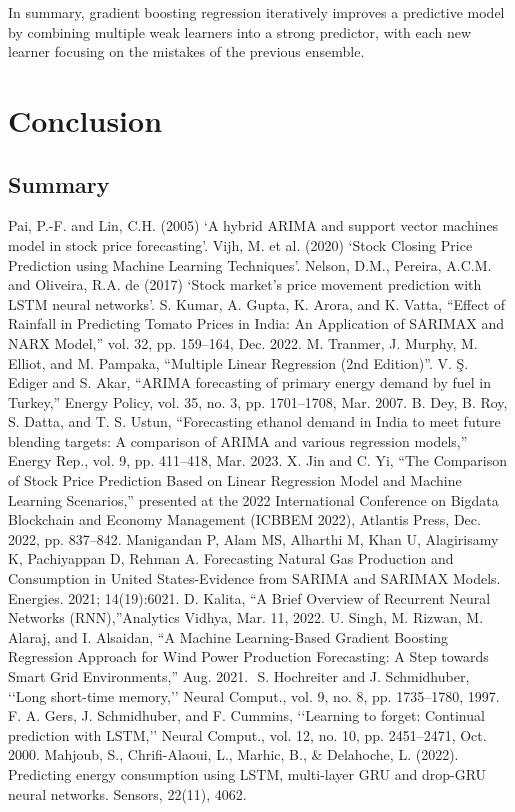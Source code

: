 \documentclass{ieeeojies}
\begin{document}
In summary, gradient boosting regression iteratively improves a predictive model by combining multiple weak learners into a strong predictor, with each new learner focusing on the mistakes of the previous ensemble.

\section{Conclusion}
\subsection{Summary}

\begin{thebibliography}{00}
 Pai, P.-F. and Lin, C.H. (2005) ‘A hybrid ARIMA and support vector machines model in stock price forecasting’.
 Vijh, M. et al. (2020) ‘Stock Closing Price Prediction using Machine Learning Techniques’.
Nelson, D.M., Pereira, A.C.M. and Oliveira, R.A. de (2017) ‘Stock market’s price movement prediction with LSTM neural networks’.
S. Kumar, A. Gupta, K. Arora, and K. Vatta, “Effect of Rainfall in Predicting Tomato Prices in India: An Application of SARIMAX and NARX Model,” vol. 32, pp. 159–164, Dec. 2022. 
M. Tranmer, J. Murphy, M. Elliot, and M. Pampaka, “Multiple Linear Regression (2nd Edition)”.
V. Ş. Ediger and S. Akar, “ARIMA forecasting of primary energy demand by fuel in Turkey,” Energy Policy, vol. 35, no. 3, pp. 1701–1708, Mar. 2007. 
B. Dey, B. Roy, S. Datta, and T. S. Ustun, “Forecasting ethanol demand in India to meet future blending targets: A comparison of ARIMA and various regression models,” Energy Rep., vol. 9, pp. 411–418, Mar. 2023.
X. Jin and C. Yi, “The Comparison of Stock Price Prediction Based on Linear Regression Model and Machine Learning Scenarios,” presented at the 2022 International Conference on Bigdata Blockchain and Economy Management (ICBBEM 2022), Atlantis Press, Dec. 2022, pp. 837–842.
Manigandan P, Alam MS, Alharthi M, Khan U, Alagirisamy K, Pachiyappan D, Rehman A. Forecasting Natural Gas Production and Consumption in United States-Evidence from SARIMA and SARIMAX Models. Energies. 2021; 14(19):6021. 
D. Kalita, “A Brief Overview of Recurrent Neural Networks (RNN),”Analytics Vidhya, Mar. 11, 2022.
U. Singh, M. Rizwan, M. Alaraj, and I. Alsaidan, “A Machine Learning-Based Gradient Boosting Regression Approach for Wind Power Production Forecasting: A Step towards Smart Grid Environments,” Aug. 2021.
‌ S. Hochreiter and J. Schmidhuber, ‘‘Long short-time memory,’’ Neural Comput., vol. 9, no. 8, pp. 1735–1780, 1997.
F. A. Gers, J. Schmidhuber, and F. Cummins, ‘‘Learning to forget:
Continual prediction with LSTM,’’ Neural Comput., vol. 12, no. 10, pp. 2451–2471, Oct. 2000.
Mahjoub, S., Chrifi-Alaoui, L., Marhic, B., \& Delahoche, L. (2022). Predicting energy consumption using LSTM, multi-layer GRU and drop-GRU neural networks. Sensors, 22(11), 4062.

\end{thebibliography}
\EOD
\end{document}
